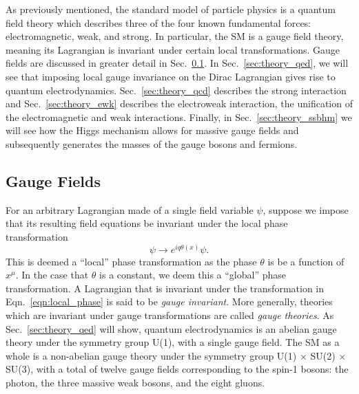 As previously mentioned, the standard model of particle physics is a quantum field theory which describes three of the four known fundamental forces: electromagnetic, weak, and strong.
In particular, the SM is a gauge field theory, meaning its Lagrangian is invariant under certain local transformations.
Gauge fields are discussed in greater detail in Sec.~\ref{sec:theory_gauge}.
In Sec.~\ref{sec:theory_qed}, we will see that imposing local gauge invariance on the Dirac Lagrangian gives rise to quantum electrodynamics.
Sec.~\ref{sec:theory_qcd} describes the strong interaction and Sec.~\ref{sec:theory_ewk} describes the electroweak interaction, the unification of the electromagnetic and weak interactions.
Finally, in Sec.~\ref{sec:theory_ssbhm} we will see how the Higgs mechanism allows for massive gauge fields and subsequently generates the masses of the gauge bosons and fermions.

\subsection{Gauge Fields} \label{sec:theory_gauge}
For an arbitrary Lagrangian made of a single field variable $\psi$, suppose we impose that its resulting field equations be invariant under the local phase transformation
\begin{equation} \label{eqn:local_phase}
    \psi \to e^{i q \theta(x)} \psi.
\end{equation}
This is deemed a ``local'' phase transformation as the phase $\theta$ is be a function of $x^\mu$.
In the case that $\theta$ is a constant, we deem this a ``global'' phase transformation.
A Lagrangian that is invariant under the transformation in Eqn.~\ref{eqn:local_phase} is said to be \emph{gauge invariant}.
More generally, theories which are invariant under gauge transformations are called \emph{gauge theories}.
As Sec.~\ref{sec:theory_qed} will show, quantum electrodynamics is an abelian gauge theory under the symmetry group U(1), with a single gauge field.
The SM as a whole is a non-abelian gauge theory under the symmetry group U(1) $\times$ SU(2) $\times$ SU(3), with a total of twelve gauge fields corresponding to the spin-1 bosons: the photon, the three massive weak bosons, and the eight gluons.

